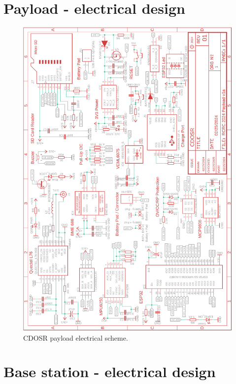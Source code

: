 \documentclass[11pt]{article}
\begin{document}
\section{Payload  - electrical design}\label{AE2}
\begin{figure}[h]
    \centering
    \includegraphics[width=11.4cm]{images/payload4.png}
    \caption{\small{CDOSR payload electrical scheme.}}
\end{figure}
\newpage

\section{Base station - electrical design}\label{AEE2}
\end{document}
